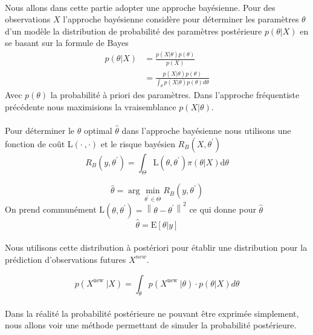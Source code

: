 \documentclass{article}
\theoremstyle{definition}
\theoremstyle{remark}
\begin{document}
\paragraph{}
Nous allons dans cette partie adopter une approche bayésienne.
Pour des observations $X$ l'approche bayésienne considère pour déterminer les paramètres $\theta$ d'un modèle la distribution de probabilité des 
paramètres postérieure $p(\theta | X)$ en se basant sur la formule de Bayes
\[
	\begin{aligned}
		p(\theta | X) &= \frac{p(X | \theta) p(\theta)}{p(X)} \\
		&= \frac{p(X | \theta) p(\theta)}{\int_{\theta} p(X | \theta) p(\theta) d \theta}	
	\end{aligned}
	\] 
	Avec $p(\theta)$ la probabilité à priori des paramètres. 
	Dans l'approche fréquentiste précédente nous maximisions la vraisemblance $p(X | \theta)$.
	\paragraph{}
	Pour déterminer le $\theta$ optimal $\hat{\theta}$ dans l'approche bayésienne nous utilisons une fonction de coût L$(\cdot\ ,\cdot)$
	et le risque bayésien $R_B(X,{\theta}^\prime)$ 
	\[
		R_B(y,\theta^\prime) = \int_{\Theta} \text{L}(\theta, \theta^\prime) \pi(\theta | X) \mathrm{d} \theta
		\]
		
		\begin{equation}
			\hat{\theta}=\arg \min _{\theta^\prime \in \Theta} R_B(y,\theta^\prime)
		\end{equation}   
		On prend communément L$(\theta,\theta^\prime) = \left\|\theta-\theta^{\prime}\right\|^{2}$ ce qui donne pour $\hat{\theta}$
		$$
		\hat{\theta}=\mathrm{E}[{\theta} | y]
		$$
		\paragraph{}
		Nous utilisons cette distribution à postériori pour établir une distribution pour la prédiction d'observations futures $X^{new}$.

		\begin{equation}
			{p}\left(X^{\text {new }} | {X}\right)=\int_{\theta} {p}\left(X^{\text {new }} | \theta\right) \cdot {p}(\theta | {X}) d \theta
		\end{equation}
		
		\paragraph{}
		Dans la réalité la probabilité postérieure ne pouvant être exprimée simplement, nous allons voir une méthode permettant de simuler
		la probabilité postérieure.
		
\end{document}
